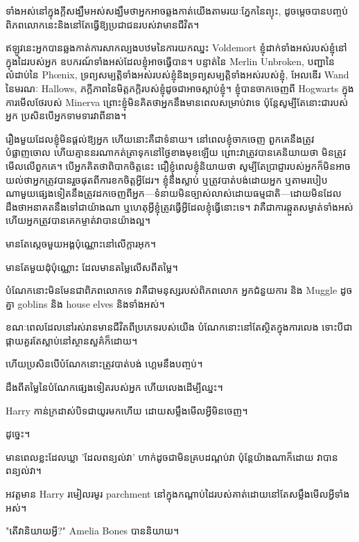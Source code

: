 \begin{writtenNote}
ទាំងអស់នៅក្នុងក្តីសង្ឃឹមអស់សង្ឃឹមថាអ្នកអាចឆ្លងកាត់យើងតាមរយៈភ្នែកនៃព្យុះ, ដូចម្ដេចបានបញ្ចប់ពិភពលោកនេះនិងនៅតែធ្វើឱ្យប្រជាជនរបស់វាមានជីវិត។

ឥឡូវនេះអ្នកបានឆ្លងកាត់ការសាកល្បងបឋមនៃការយកឈ្នះ Voldemort ខ្ញុំដាក់ទាំងអស់របស់ខ្ញុំនៅក្នុងដៃរបស់អ្នក ឧបករណ៍ទាំងអស់ដែលខ្ញុំអាចធ្វើបាន។ បន្ទាត់នៃ Merlin Unbroken, បញ្ជានៃលំដាប់នៃ Phœnix, ទ្រព្យសម្បត្តិទាំងអស់របស់ខ្ញុំនិងទ្រព្យសម្បត្ដិទាំងអស់របស់ខ្ញុំ, អែលឌើរ Wand នៃមរណៈ Hallows, ភក្ដីភាពនៃមិត្តភក្តិរបស់ខ្ញុំដូចជាអាចស្តាប់ខ្ញុំ។ ខ្ញុំបានចាកចេញពី Hogwarts ក្នុងការមើលថែរបស់ Minerva ព្រោះខ្ញុំមិនគិតថាអ្នកនឹងមានពេលសម្រាប់វាទេ ប៉ុន្តែសូម្បីតែនោះជារបស់អ្នក ប្រសិនបើអ្នកទាមទារវាពីនាង។

រឿងមួយដែលខ្ញុំមិនផ្តល់ឱ្យអ្នក ហើយនោះគឺជាទំនាយ។ នៅពេលខ្ញុំចាកចេញ ពួកគេនឹងត្រូវបំផ្លាញចោល ហើយគ្មាននរណាកត់ត្រាទុកនៅថ្ងៃខាងមុខឡើយ ព្រោះវាត្រូវបានគេនិយាយថា មិនត្រូវមើលលើពួកគេ។ បើ​អ្នក​គិត​ថា​ពិបាក​ចិត្ត​នេះ ជឿ​ខ្ញុំ​ពេល​ខ្ញុំ​និយាយ​ថា សូម្បី​តែ​ប្រាជ្ញា​របស់​អ្នក​ក៏​មិន​អាច​យល់​ថា​អ្នក​ត្រូវ​បាន​រួច​ផុត​ពី​ការ​ខក​ចិត្ត​អ្វី​ដែរ។ ខ្ញុំនឹងស្លាប់ ឬត្រូវបាត់បង់ដោយអ្នក ឬតាមរបៀបណាមួយផ្សេងទៀតនឹងត្រូវដកចេញពីអ្នក—ទំនាយមិនច្បាស់លាស់ដោយធម្មជាតិ—ដោយមិនដែលដឹងថាអនាគតនឹងទៅជាយ៉ាងណា ឬហេតុអ្វីខ្ញុំត្រូវធ្វើអ្វីដែលខ្ញុំធ្វើនោះទេ។ វា​គឺ​ជា​ការ​ឆ្កួត​សម្ងាត់​ទាំង​អស់ ហើយ​អ្នក​ត្រូវ​បាន​គេ​កម្ចាត់​វា​បាន​យ៉ាង​ល្អ។

មានតែស្តេចមួយអង្គប៉ុណ្ណោះនៅលើក្តារអុក។

មានតែមួយដុំប៉ុណ្ណោះ ដែលមានតម្លៃលើសពីតម្លៃ។

បំណែកនោះមិនមែនជាពិភពលោកទេ វាគឺជាមនុស្សរបស់ពិភពលោក អ្នកជំនួយការ និង Muggle ដូចគ្នា goblins និង house elves និងទាំងអស់។

ខណៈពេលដែលនៅរស់រានមានជីវិតពីប្រភេទរបស់យើង បំណែកនោះនៅតែស្ថិតក្នុងការលេង ទោះបីជាផ្កាយគួរតែស្លាប់នៅស្ថានសួគ៌ក៏ដោយ។

ហើយប្រសិនបើបំណែកនោះត្រូវបាត់បង់ ហ្គេមនឹងបញ្ចប់។

ដឹងពីតម្លៃនៃបំណែកផ្សេងទៀតរបស់អ្នក ហើយលេងដើម្បីឈ្នះ។

\end{writtenNote}

\later

Harry កាន់​ក្រដាស់​បិទ​ជា​យូរ​មក​ហើយ ដោយ​សម្លឹង​មើល​អ្វី​មិន​ចេញ។

ដូច្នេះ។

មានពេលខ្លះដែលឃ្លា 'ដែលពន្យល់វា' ហាក់ដូចជាមិនគ្របដណ្តប់វា ប៉ុន្តែយ៉ាងណាក៏ដោយ វាបានពន្យល់វា។

អវត្តមាន Harry រមៀលរមូរ parchment នៅក្នុងកណ្តាប់ដៃរបស់គាត់ដោយនៅតែសម្លឹងមើលអ្វីទាំងអស់។

"តើវានិយាយអ្វី?" Amelia Bones បាននិយាយ។

